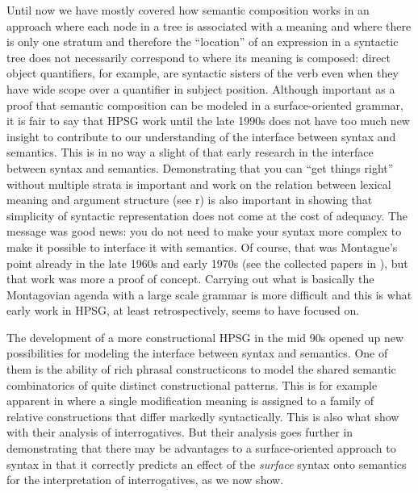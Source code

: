 \documentclass[output=paper]{langsci/langscibook}
\begin{document}
Until now we have mostly covered how semantic composition works in an approach where each node in a tree is associated with a meaning and where there is only one stratum and therefore the ``location'' of an expression in a syntactic tree does not necessarily correspond to where its meaning is composed: direct object quantifiers, for example, are syntactic sisters of the verb even when they have wide scope over a quantifier in subject position. Although important as a proof that semantic composition can be modeled in a surface-oriented grammar, it is fair to say that HPSG work until the late 1990s does not have too much new insight to contribute to our understanding of the interface between syntax and semantics. This is in no way a slight of that early research in the interface between syntax and semantics. Demonstrating that you can ``get things right'' without multiple strata is important and work on the relation between lexical meaning and argument structure (see r) is also important in showing that simplicity of syntactic representation does not come at the cost of adequacy. The message was good news: you do not need to make your syntax more complex to make it possible to interface it with semantics. Of course, that was Montague's point already in the late 1960s and early 1970s (see the collected papers in \citealt{Montague1974}), but that work was more a proof of concept.  Carrying out what is basically the Montagovian agenda with a large scale grammar is more difficult and this is what early work in HPSG, at least retrospectively, seems to have focused on.

The development of a more constructional HPSG in the mid 90s opened up new possibilities for modeling the interface between syntax and semantics. One of them is the ability of rich phrasal constructicons to model the shared semantic combinatorics of quite distinct constructional patterns. This is for example apparent in \citet{Sag1997} where a single modification meaning is assigned to a family of relative constructions that differ markedly syntactically. This is also what \citet{GinzburgandSag2001} show with their analysis of interrogatives. But their analysis goes further in demonstrating that there may be advantages to a surface-oriented approach to syntax in that it correctly predicts an effect of the \emph{surface} syntax onto semantics for the interpretation of interrogatives, as we now show. 
\end{document}
